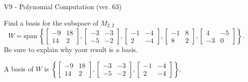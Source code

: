 \begin{exercise}
  \begin{exerciseTitle}V9 - Polynomial Computation (ver. 63)\end{exerciseTitle}
  \begin{exerciseStatement}
    Find a basis for the subspace of \(M_{2,2}\) 
\[W=\mathrm{span}\ \left\{\left[\begin{array}{cc}
-9 & 18 \\
14 & 2
\end{array}\right] , \left[\begin{array}{cc}
-3 & -3 \\
-5 & -2
\end{array}\right] , \left[\begin{array}{cc}
-1 & -4 \\
2 & -4
\end{array}\right] , \left[\begin{array}{cc}
-1 & 8 \\
8 & 2
\end{array}\right] , \left[\begin{array}{cc}
4 & -5 \\
-3 & 0
\end{array}\right]\right\}.\]
 Be sure to explain why your result is a basis.


  \end{exerciseStatement}
  \begin{exerciseAnswer}
   A basis of \(W\) is  \(\left\{\left[\begin{array}{cc}
-9 & 18 \\
14 & 2
\end{array}\right] , \left[\begin{array}{cc}
-3 & -3 \\
-5 & -2
\end{array}\right] , \left[\begin{array}{cc}
-1 & -4 \\
2 & -4
\end{array}\right]\right\}\).
  


  \end{exerciseAnswer}
\end{exercise}